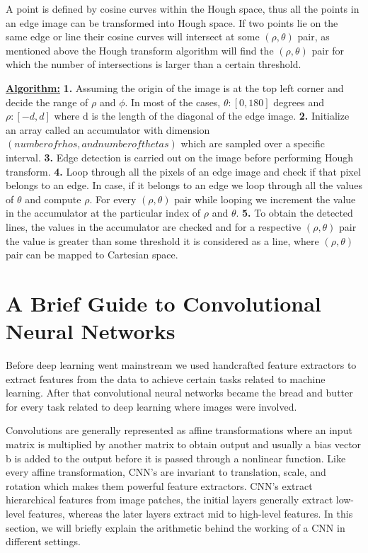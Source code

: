      A point is defined by cosine curves within the Hough space, thus all the points in an edge image can be transformed into Hough space. If two points lie on the same edge or line their cosine curves will intersect at some $(\rho,\theta)$ pair, as mentioned above the Hough transform algorithm will find the $(\rho,\theta)$ pair for which the number of intersections is larger than a certain threshold\cite{hough1001}. \newline 
    
    
    \underline{\textbf{Algorithm:}} \newline
    \textbf{1.} Assuming the origin of the image is at the top left corner and decide the range of $\rho$ and $\phi$. In most of the cases, $\theta:[0, 180]$ degrees and $\rho:[-d,d]$ where d is the length of the diagonal of the edge image. \newline
    \textbf{2.} Initialize an array called an accumulator with dimension $(number of rhos, and number of thetas)$ which are sampled over a specific interval. \newline
    \textbf{3.} Edge detection is carried out on the image before performing Hough transform.\newline 
    \textbf{4.} Loop through all the pixels of an edge image and check if that pixel belongs to an edge. In case, if it belongs to an edge we loop through all the values of $\theta$ and compute $\rho$. For every $(\rho, \theta)$ pair while looping we increment the value in the accumulator at the particular index of $\rho$ and $\theta$. \newline
    \textbf{5.} To obtain the detected lines, the values in the accumulator are checked and for a respective $(\rho,\theta)$ pair the value is greater than some threshold it is considered as a line, where $(\rho,\theta)$ pair can be mapped to Cartesian space.  
    
    \section{A Brief Guide to Convolutional Neural Networks}
    Before deep learning went mainstream we used handcrafted feature extractors to extract features from the data to achieve certain tasks related to machine learning.
    After that convolutional neural networks became the bread and butter for every task related to deep learning where images were involved. 
    
    Convolutions are generally represented as affine transformations where an input matrix is multiplied by another matrix to obtain output and usually a bias vector b is added to the output before it is passed through a nonlinear function. Like every affine transformation, CNN's are invariant to translation, scale, and rotation which makes them powerful feature extractors. CNN's extract hierarchical features from image patches, the initial layers generally extract low-level features, whereas the later layers extract mid to high-level features. In this section, we will briefly explain the arithmetic behind the working of a CNN in different settings. 
    
